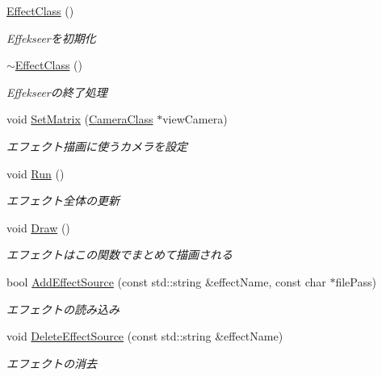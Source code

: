 \begin{DoxyCompactItemize}
\item 
\mbox{\hyperlink{class_k___graphics_1_1_effect_class_a33755c964db87d459d46c28788b19dd2}{Effect\+Class}} ()
\begin{DoxyCompactList}\small\item\em Effekseerを初期化 \end{DoxyCompactList}\item 
\mbox{\hyperlink{class_k___graphics_1_1_effect_class_ab51e3f43095aac4bb6f7826254c4723b}{$\sim$\+Effect\+Class}} ()
\begin{DoxyCompactList}\small\item\em Effekseerの終了処理 \end{DoxyCompactList}\item 
void \mbox{\hyperlink{class_k___graphics_1_1_effect_class_ac23549936fee9b53059d94dfd0679413}{Set\+Matrix}} (\mbox{\hyperlink{class_k___graphics_1_1_camera_class}{Camera\+Class}} $\ast$view\+Camera)
\begin{DoxyCompactList}\small\item\em エフェクト描画に使うカメラを設定 \end{DoxyCompactList}\item 
void \mbox{\hyperlink{class_k___graphics_1_1_effect_class_a60605a1855dbfc6ce6a97b7014a148c0}{Run}} ()
\begin{DoxyCompactList}\small\item\em エフェクト全体の更新 \end{DoxyCompactList}\item 
void \mbox{\hyperlink{class_k___graphics_1_1_effect_class_aee527e320342f218b88293f41beec6e7}{Draw}} ()
\begin{DoxyCompactList}\small\item\em エフェクトはこの関数でまとめて描画される \end{DoxyCompactList}\item 
bool \mbox{\hyperlink{class_k___graphics_1_1_effect_class_a24ee0a55014d5f2ef0b29ebce31d8d1f}{Add\+Effect\+Source}} (const std\+::string \&effect\+Name, const char $\ast$file\+Pass)
\begin{DoxyCompactList}\small\item\em エフェクトの読み込み \end{DoxyCompactList}\item 
void \mbox{\hyperlink{class_k___graphics_1_1_effect_class_abe5a20c2680329b045d3a60dddb886ed}{Delete\+Effect\+Source}} (const std\+::string \&effect\+Name)
\begin{DoxyCompactList}\small\item\em エフェクトの消去 \end{DoxyCompactList}\item 

\end{DoxyCompactItemize}
